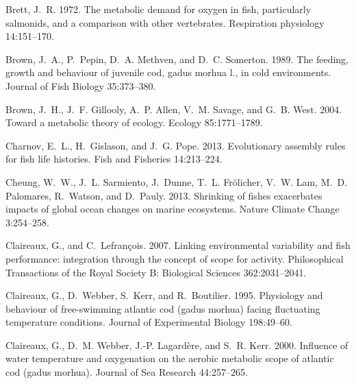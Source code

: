 \documentclass[11pt]{article}\usepackage[]{graphicx}\usepackage[]{color,soul}
\begin{document}
\begin{thebibliography}{62}
Brett, J.~R. 1972.
\newblock The metabolic demand for oxygen in fish, particularly salmonids, and
  a comparison with other vertebrates.
\newblock Respiration physiology 14:151--170.

Brown, J.~A., P.~Pepin, D.~A. Methven, and D.~C. Somerton. 1989.
\newblock The feeding, growth and behaviour of juvenile cod, gadus morhua l.,
  in cold environments.
\newblock Journal of Fish Biology 35:373--380.

Brown, J.~H., J.~F. Gillooly, A.~P. Allen, V.~M. Savage, and G.~B. West. 2004.
\newblock Toward a metabolic theory of ecology.
\newblock Ecology 85:1771--1789.

Charnov, E.~L., H.~Gislason, and J.~G. Pope. 2013.
\newblock Evolutionary assembly rules for fish life histories.
\newblock Fish and Fisheries 14:213--224.

Cheung, W.~W., J.~L. Sarmiento, J.~Dunne, T.~L. Frölicher, V.~W. Lam, M.~D.
  Palomares, R.~Watson, and D.~Pauly. 2013.
\newblock Shrinking of fishes exacerbates impacts of global ocean changes on
  marine ecosystems.
\newblock Nature Climate Change 3:254--258.

Claireaux, G., and C.~Lefrançois. 2007.
\newblock Linking environmental variability and fish performance: integration
  through the concept of scope for activity.
\newblock Philosophical Transactions of the Royal Society B: Biological
  Sciences 362:2031--2041.

Claireaux, G., D.~Webber, S.~Kerr, and R.~Boutilier. 1995.
\newblock Physiology and behaviour of free-swimming atlantic cod (gadus morhua)
  facing fluctuating temperature conditions.
\newblock Journal of Experimental Biology 198:49--60.

Claireaux, G., D.~M. Webber, J.-P. Lagardère, and S.~R. Kerr. 2000.
\newblock Influence of water temperature and oxygenation on the aerobic
  metabolic scope of atlantic cod (gadus morhua).
\newblock Journal of Sea Research 44:257--265.


\end{thebibliography}
\end{document}
